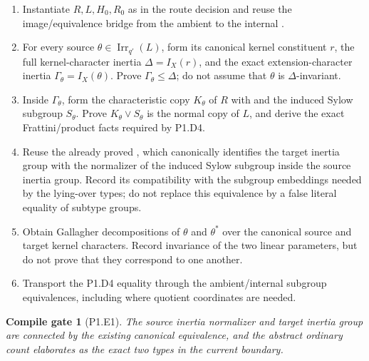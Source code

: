\documentclass[11pt]{article}
\newtheorem{gate}{Compile gate}
\newcommand{\Irr}{\operatorname{Irr}}
\begin{document}
\begin{enumerate}[label=\textbf{P1.E1.\arabic*.},leftmargin=*]
  \item Instantiate \(R,L,H_0,R_0\) as in the route decision and reuse the
  image/equivalence bridge from the ambient
   to the internal
  .
  \item For every source \(\theta\in\Irr_{q'}(L)\), form its canonical
  kernel constituent \(r\), the full kernel-character inertia
  \(\Delta=I_X(r)\), and the exact extension-character inertia
  \(\Gamma_\theta=I_X(\theta)\).  Prove
  \(\Gamma_\theta\leq\Delta\); do not assume that \(\theta\) is
  \(\Delta\)-invariant.
  \item Inside \(\Gamma_\theta\), form the characteristic copy
  \(K_\theta\) of \(R\) with  and the induced
  Sylow subgroup \(S_\theta\).  Prove
  \(K_\theta\vee S_\theta\) is the normal copy of \(L\), and derive the
  exact Frattini/product facts required by P1.D4.
  \item Reuse the already proved
  ,
  which canonically identifies the target inertia group with the normalizer
  of the induced Sylow subgroup inside the source inertia group.  Record
  its compatibility with the subgroup embeddings needed by the
  lying-over types; do not replace this equivalence by a false literal
  equality of subtype groups.
  \item Obtain Gallagher decompositions of \(\theta\) and
  \(\theta^*\) over the canonical source and target kernel characters.
  Record invariance of the two linear parameters, but do not prove that
  they correspond to one another.
  \item Transport the P1.D4 equality through the ambient/internal subgroup
  equivalences, including
   where quotient
  coordinates are needed.
\end{enumerate}

\begin{gate}[P1.E1]
The source inertia normalizer and target inertia group are connected by
the existing canonical equivalence, and the abstract ordinary count
elaborates as the exact two
 types in the current boundary.
\end{gate}
\end{document}
